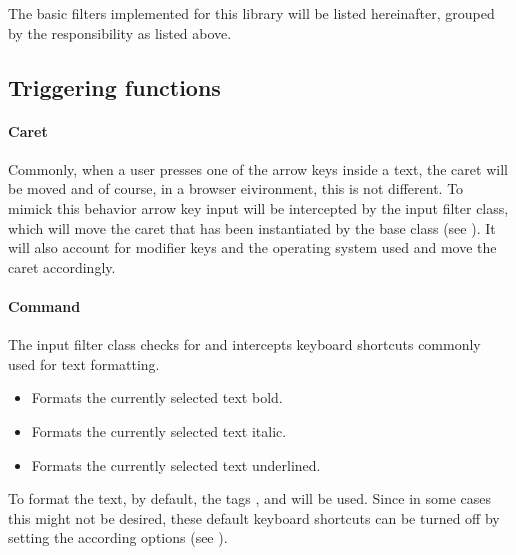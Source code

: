 The basic filters implemented for this library will be listed hereinafter, grouped by the responsibility as listed above.





\subsection{Triggering functions}

\paragraph{Caret} Commonly, when a user presses one of the arrow keys inside a text, the caret will be moved and of course, in a browser eivironment, this is not different. To mimick this behavior arrow key input will be intercepted by the  input filter class, which will move the caret that has been instantiated by the  base class (see ). It will also account for modifier keys and the operating system used and move the caret accordingly.


\paragraph{Command} The  input filter class checks for and intercepts keyboard shortcuts commonly used for text formatting. 

\begin{itemize}
\item {} Formats the currently selected text bold.
\item {} Formats the currently selected text italic. 
\item {} Formats the currently selected text underlined.
\end{itemize}

To format the text, by default, the tags ,  and  will be used. Since in some cases this might not be desired, these default keyboard shortcuts can be turned off by setting the according options (see ).

